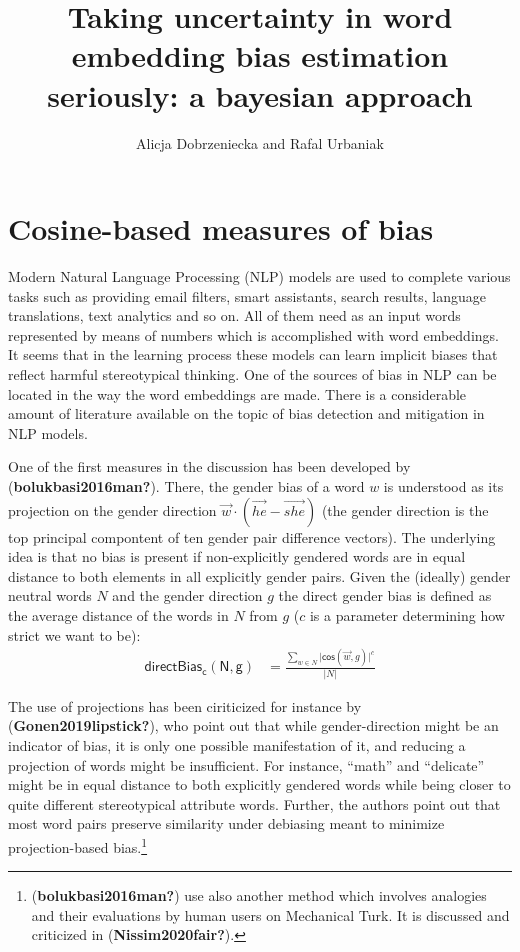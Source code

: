 \documentclass[
  10pt,
  dvipsnames,enabledeprecatedfontcommands]{scrartcl}
\title{Taking uncertainty in word embedding bias estimation seriously: a
bayesian approach}
\author{Alicja Dobrzeniecka and Rafal Urbaniak}
\date{}
\begin{document}
\maketitle

\tableofcontents

\hypertarget{cosine-based-measures-of-bias}{%
\section{Cosine-based measures of
bias}\label{cosine-based-measures-of-bias}}

Modern Natural Language Processing (NLP) models are used to complete
various tasks such as providing email filters, smart assistants, search
results, language translations, text analytics and so on. All of them
need as an input words represented by means of numbers which is
accomplished with word embeddings. It seems that in the learning process
these models can learn implicit biases that reflect harmful
stereotypical thinking. One of the sources of bias in NLP can be located
in the way the word embeddings are made. There is a considerable amount
of literature available on the topic of bias detection and mitigation in
NLP models.

One of the first measures in the discussion has been developed by
(\textbf{bolukbasi2016man?}). There, the gender bias of a word \(w\) is
understood as its projection on the gender direction
\(\vec{w} \cdot (\overrightarrow{he} - \overrightarrow{she})\) (the
gender direction is the top principal compontent of ten gender pair
difference vectors). The underlying idea is that no bias is present if
non-explicitly gendered words are in equal distance to both elements in
all explicitly gender pairs. Given the (ideally) gender neutral words
\(N\) and the gender direction \(g\) the direct gender bias is defined
as the average distance of the words in \(N\) from \(g\) (\(c\) is a
parameter determining how strict we want to be): \begin{align}
\mathsf{directBias_c(N,g)} & = \frac{\sum_{w\in N}\vert \mathsf{cos}(\vec{w},g)\vert^c}{\vert N \vert }
\end{align}

The use of projections has been ciriticized for instance by
(\textbf{Gonen2019lipstick?}), who point out that while gender-direction
might be an indicator of bias, it is only one possible manifestation of
it, and reducing a projection of words might be insufficient. For
instance, ``math'' and ``delicate'' might be in equal distance to both
explicitly gendered words while being closer to quite different
stereotypical attribute words. Further, the authors point out that most
word pairs preserve similarity under debiasing meant to minimize
projection-based bias.\footnote{(\textbf{bolukbasi2016man?}) use also
  another method which involves analogies and their evaluations by human
  users on Mechanical Turk. It is discussed and criticized in
  (\textbf{Nissim2020fair?}).}
\end{document}
